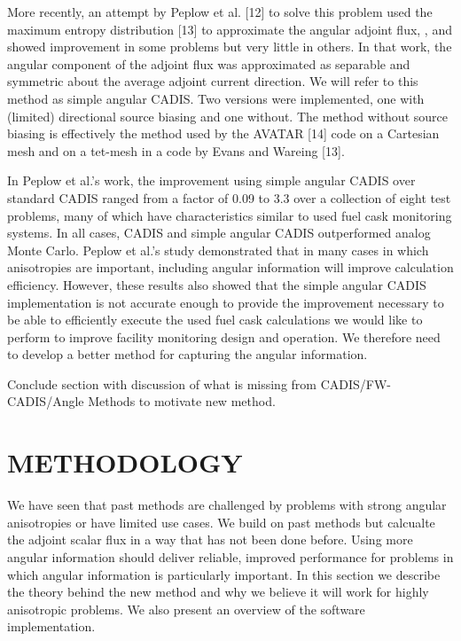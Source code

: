 \documentclass[12pt]{article}
\begin{document}
More recently, an attempt by Peplow et al. [12] to solve this problem used the maximum entropy distribution [13] to approximate the angular adjoint flux, , and showed improvement in some problems but very little in others. In that work, the angular component of the adjoint flux was approximated as separable and symmetric about the average adjoint current direction. We will refer to this method as simple angular CADIS. Two versions were implemented, one with (limited) directional source biasing and one without. The method without source biasing is effectively the method used by the AVATAR [14] code on a Cartesian mesh and on a tet-mesh in a code by Evans and Wareing [13]. 

In Peplow et al.’s work, the improvement using simple angular CADIS over standard CADIS ranged from a factor of 0.09 to 3.3 over a collection of eight test problems, many of which have characteristics similar to used fuel cask monitoring systems. In all cases, CADIS and simple angular CADIS outperformed analog Monte Carlo. Peplow et al.’s study demonstrated that in many cases in which anisotropies are important, including angular information will improve calculation efficiency. However, these results also showed that the simple angular CADIS implementation is not accurate enough to provide the improvement necessary to be able to efficiently execute the used fuel cask calculations we would like to perform to improve facility monitoring design and operation. We therefore need to develop a better method for capturing the angular information.  
	


Conclude section with discussion of what is missing from CADIS/FW-CADIS/Angle Methods to motivate new method. \\

%
\section{METHODOLOGY}
\label{sect::methodology}

We have seen that past methods are challenged by problems with strong angular anisotropies or have limited use cases.
We build on past methods but calcualte the adjoint scalar flux in a way that has not been done before.
Using more angular information should deliver reliable, improved performance for problems in which angular information is particularly important. 
In this section we describe the theory behind the new method and why we believe it will work for highly anisotropic problems. We also present an overview of the software implementation.  
\end{document}
